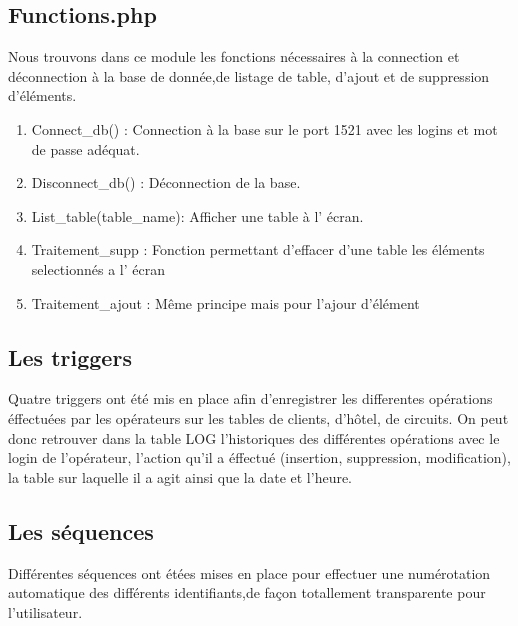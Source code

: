 \subsection{Functions.php}
Nous trouvons dans ce module les fonctions n\'ecessaires \`a la connection et d\'econnection \`a la base de donn\'ee,de listage de table, d'ajout et de suppression d'\'el\'ements.

\begin{enumerate}
\item Connect\_db() : Connection \`a la base sur le port 1521 avec les logins et mot de passe ad\'equat.
\item Disconnect\_db() : D\'econnection de la base.
\item List\_table(table\_name): Afficher une table \`a l' \'ecran.
\item Traitement\_supp : Fonction permettant d'effacer d'une table les \'el\'ements selectionn\'es a l' \'ecran
\item Traitement\_ajout : M\^eme principe mais pour l'ajour d'\'el\'ement
\end{enumerate}

\subsection{Les triggers}
Quatre triggers ont \'et\'e mis en place afin d'enregistrer les differentes op\'erations \'effectu\'ees par les op\'erateurs sur les tables de clients, d'h\^otel, de circuits.
On peut donc retrouver dans la table LOG l'historiques des diff\'erentes op\'erations avec le login de l'op\'erateur, l'action qu'il a \'effectu\'e (insertion, suppression, modification), la table sur laquelle il a agit ainsi que la date et l'heure.

\subsection{Les s\'equences}
Diff\'erentes s\'equences ont \'et\'ees mises en place pour effectuer une num\'erotation automatique des diff\'erents identifiants,de façon totallement transparente pour l'utilisateur.

\newpage